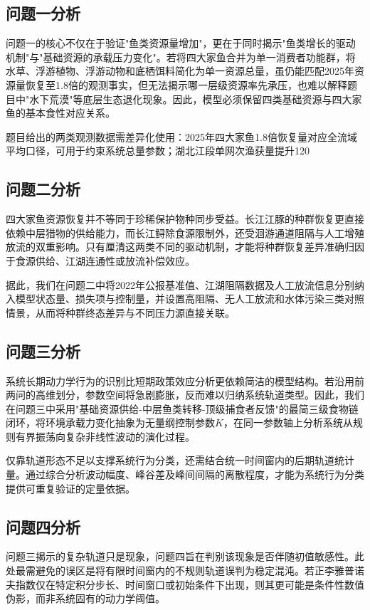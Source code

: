 \documentclass{MMCStyle}
\begin{document}
\subsection{问题一分析}
问题一的核心不仅在于验证"鱼类资源量增加"，更在于同时揭示"鱼类增长的驱动机制"与"基础资源的承载压力变化"。若将四大家鱼合并为单一消费者功能群，将水草、浮游植物、浮游动物和底栖饵料简化为单一资源总量，虽仍能匹配2025年资源量恢复至1.8倍的观测事实，但无法揭示哪一层级资源率先承压，也难以解释题目中"水下荒漠"等底层生态退化现象。因此，模型必须保留四类基础资源与四大家鱼的基本食性对应关系。

题目给出的两类观测数据需差异化使用：2025年四大家鱼1.8倍恢复量对应全流域平均口径，可用于约束系统总量参数；湖北江段单网次渔获量提升120%

\subsection{问题二分析}
四大家鱼资源恢复并不等同于珍稀保护物种同步受益。长江江豚的种群恢复更直接依赖中层猎物的供给能力，而长江鲟除食源限制外，还受洄游通道阻隔与人工增殖放流的双重影响。只有厘清这两类不同的驱动机制，才能将种群恢复差异准确归因于食源供给、江湖连通性或放流补偿效应。

据此，我们在问题二中将2022年公报基准值、江湖阻隔数据及人工放流信息分别纳入模型状态量、损失项与控制量，并设置高阻隔、无人工放流和水体污染三类对照情景，从而将种群终态差异与不同压力源直接关联。

\subsection{问题三分析}
系统长期动力学行为的识别比短期政策效应分析更依赖简洁的模型结构。若沿用前两问的高维划分，参数空间将急剧膨胀，反而难以归纳系统轨道类型。因此，我们在问题三中采用"基础资源供给-中层鱼类转移-顶级捕食者反馈"的最简三级食物链闭环，将环境承载力变化抽象为无量纲控制参数$K$，在同一参数轴上分析系统从规则有界振荡向复杂非线性波动的演化过程。

仅靠轨道形态不足以支撑系统行为分类，还需结合统一时间窗内的后期轨道统计量。通过综合分析波动幅度、峰谷差及峰间间隔的离散程度，才能为系统行为分类提供可重复验证的定量依据。

\subsection{问题四分析}
问题三揭示的复杂轨道只是现象，问题四旨在判别该现象是否伴随初值敏感性。此处最需避免的误区是将有限时间窗内的不规则轨道误判为稳定混沌。若正李雅普诺夫指数仅在特定积分步长、时间窗口或初始条件下出现，则其更可能是条件性数值伪影，而非系统固有的动力学阈值。
\end{document}
